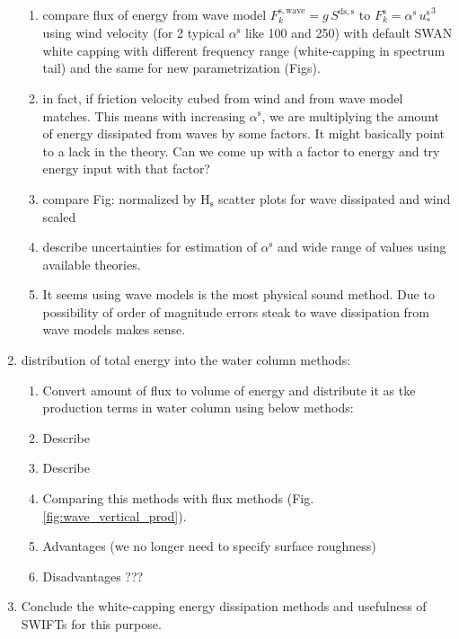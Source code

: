 \documentclass[final]{svjour3}
\begin{document}
\begin{enumerate}
\begin{enumerate}
          \item compare flux of energy from wave model $F_k^\mathrm{s,wave}=g \,
          S^{\mathrm{ds,s}}$ to $F_k^\mathrm{s}=\alpha^\mathrm{s} \,
          {u_*^\mathrm{s}}^3$ using wind velocity (for 2 typical $\alpha^\mathrm{s}$
          like 100 and 250) with default SWAN white capping with different frequency
          range (white-capping in spectrum tail) and the same for new
          parametrization (Figs).   
          \item in fact, if friction velocity cubed from wind and
          from wave model matches. This means with increasing
          $\alpha^\mathrm{s}$, we are multiplying the amount of energy dissipated from
          waves by some factors.
          It might basically point to a lack  in the theory. Can we come up
          with a factor to energy and try energy input with that factor? 
          \item compare  Fig: normalized by H$_\mathrm{s}$ scatter plots  for wave
          dissipated and wind scaled
          \item describe uncertainties for estimation of $\alpha^\mathrm{s}$ and wide range
          of values using available theories.
          \item It seems using wave models is the most physical sound method. Due
          to possibility of order of magnitude errors steak to wave dissipation from
          wave models makes sense.
  \end{enumerate}

  \item distribution of total energy into the water column methods:
      \begin{enumerate}
        \item Convert amount of flux to volume of energy and distribute it as tke
        production terms in water column using below methods:
        \item Describe \cite{sullivan2004oceanic,sullivan2007surface}
        \item Describe \cite{kudryavtsev2008vertical}
        \item Comparing this methods with flux methods (Fig.
        \ref{fig:wave_vertical_prod}).
        \item Advantages (we no longer need to specify surface roughness)
        \item Disadvantages ??? 
       \end{enumerate}
\item Conclude the white-capping energy dissipation methods and usefulness of
SWIFTs for this purpose.

\end{enumerate}
\end{document}
